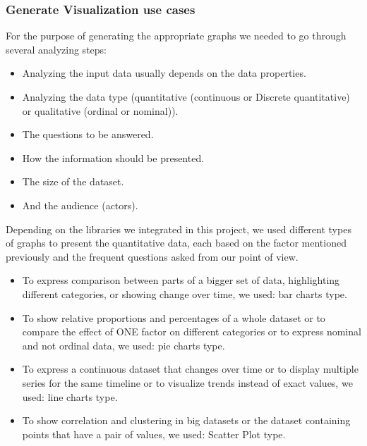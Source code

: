 \subsubsection*{Generate Visualization use cases}
For the purpose of generating the appropriate graphs we needed to go through several analyzing steps:
\begin{itemize}
\renewcommand{\labelitemi}{$\bullet$}
\item Analyzing the input data usually depends on the data properties.
\item Analyzing the data type (quantitative (continuous or Discrete quantitative) or qualitative (ordinal or nominal)).
\item The questions to be answered.
\item How the information should be presented.
\item The size of the dataset.
\item And the audience (actors).
\end{itemize}

\bigbreak
Depending on the libraries we integrated in this project, we used different types of graphs to present the quantitative data, each based on the factor mentioned previously and the frequent questions asked from our point of view.
\begin{itemize}
  \renewcommand{\labelitemi}{$\bullet$}
  \item To express comparison between parts of a bigger set of data, highlighting different categories, or showing change over time, we used: bar charts type.
  \item To show relative proportions and percentages of a whole dataset or to compare the effect of ONE factor on different categories or to express nominal and not ordinal data, we used: pie charts type. 
  \item To express a continuous dataset that changes over time or to display multiple series for the same timeline or to visualize trends instead of exact values, we used: line charts type.
\item To show correlation and clustering in big datasets or the dataset containing points that have a pair of values, we used: Scatter Plot type.
\end{itemize}


